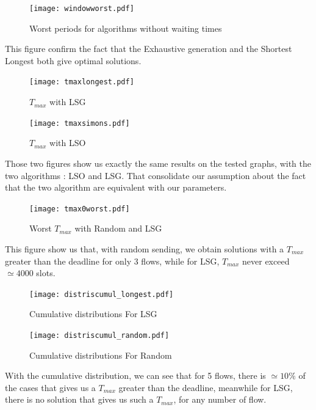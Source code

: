 \documentclass[a4paper,10pt]{report}
\begin{document}
 
\begin{figure}[H]
\hspace*{-3cm}
\centering
\texttt{[image: windowworst.pdf]}%
\caption{Worst periods for algorithms without waiting times}
\end{figure}
This figure confirm the fact that the Exhaustive generation and the Shortest Longest both give optimal solutions.

\begin{figure}[H]
\hspace*{-3cm}
\centering
\texttt{[image: tmaxlongest.pdf]}%
\caption{$T_{max}$ with LSG}
\end{figure}

\begin{figure}[H]
\hspace*{-3cm}
\centering
\texttt{[image: tmaxsimons.pdf]}%
\caption{$T_{max}$ with LSO}
\end{figure}
Those two figures show us exactly the same results on the tested graphs, with the two algorithms : LSO and LSG. That consolidate our assumption about the fact that the two algorithm are equivalent with our parameters.


\begin{figure}[H]
\hspace*{-3cm}
\centering
\texttt{[image: tmax0worst.pdf]}%
\caption{Worst $T_{max}$ with Random and LSG}
\end{figure}
This figure show us that, with random sending, we obtain solutions with a $T_{max}$ greater than the deadline for only 3 flows, while for LSG, $T_{max}$ never exceed $\simeq 4000$ slots.


\begin{figure}[H]
\hspace*{-3cm}
\centering
\texttt{[image: distriscumul\_longest.pdf]}%
\caption{Cumulative distributions For LSG}
\end{figure}

\begin{figure}[H]
\hspace*{-3cm}
\centering
\texttt{[image: distriscumul\_random.pdf]}%
\caption{Cumulative distributions For Random}
\end{figure}

With the cumulative distribution, we can see that for 5 flows, there is $\simeq 10\%$ of the cases that gives us a $T_{max}$ greater than the deadline, meanwhile for LSG, there is no solution that gives us such a $T_{max}$, for any number of flow.




\end{document}
